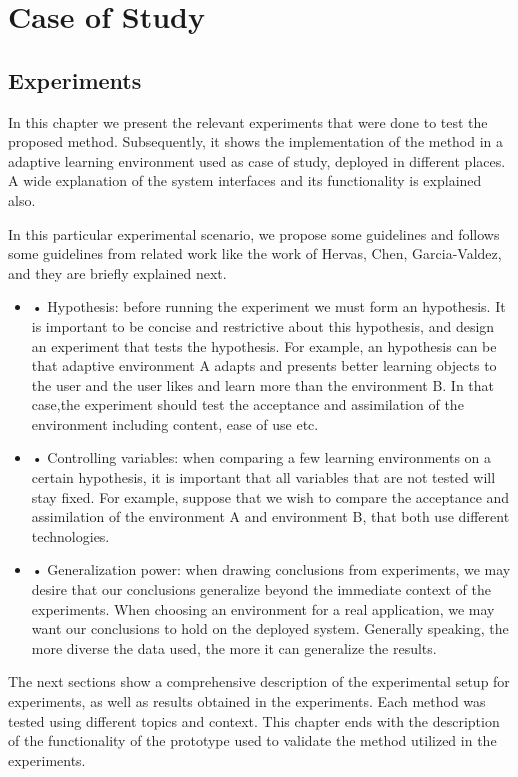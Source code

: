 \chapter{Case of Study} \label{expres} 
\section{Experiments}
In this chapter we present the relevant experiments that were done to test the proposed method. Subsequently, it shows the implementation of the method in a adaptive learning environment used as case of study, deployed in different places. A wide explanation of the system interfaces and its functionality is explained also.

In this particular experimental scenario, we propose some guidelines and follows some guidelines from related work like the work of Hervas\cite{bravo2005display}, Chen\cite{Chen2007}, Garcia-Valdez\cite{mariotesis}, and they are brieﬂy explained next.
\begin{itemize}	

\item • Hypothesis: before running the experiment we must form an hypothesis. It is important to be concise and restrictive about this hypothesis, and design an experiment that tests the hypothesis. For example, an hypothesis can be that adaptive environment A adapts and presents better learning objects to the user and the user likes and learn more than the environment B. In that case,the experiment should test the acceptance and assimilation of the environment including content, ease of use etc.

\item • Controlling variables: when comparing a few learning environments on a certain hypothesis, it is important that all variables that are not tested will
stay fixed. For example, suppose that we wish to compare the acceptance and assimilation of the environment A and environment B, that both use
different technologies. 

\item • Generalization power: when drawing conclusions from experiments, we may desire that our conclusions generalize beyond the immediate context of the experiments. When choosing an environment for a real application, we may want our conclusions to hold on the deployed system. Generally speaking, the more diverse the data used, the more it can generalize the results.
\end{itemize}

The next sections show a comprehensive description of the experimental setup for experiments, as well as results obtained in the experiments. Each method was tested
using different topics and context. This chapter ends with the description of the functionality of the prototype used to validate the method utilized in the experiments.

